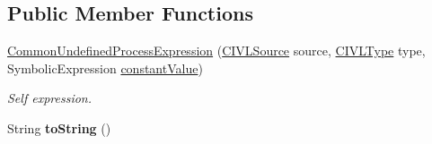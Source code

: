 \subsection*{Public Member Functions}
\begin{DoxyCompactItemize}
\item 
\hyperlink{classedu_1_1udel_1_1cis_1_1vsl_1_1civl_1_1model_1_1common_1_1expression_1_1CommonUndefinedProcessExpression_a40c6feffcf30d3a8f9f5eccdd7dcc546}{Common\+Undefined\+Process\+Expression} (\hyperlink{interfaceedu_1_1udel_1_1cis_1_1vsl_1_1civl_1_1model_1_1IF_1_1CIVLSource}{C\+I\+V\+L\+Source} source, \hyperlink{interfaceedu_1_1udel_1_1cis_1_1vsl_1_1civl_1_1model_1_1IF_1_1type_1_1CIVLType}{C\+I\+V\+L\+Type} type, Symbolic\+Expression \hyperlink{classedu_1_1udel_1_1cis_1_1vsl_1_1civl_1_1model_1_1common_1_1expression_1_1CommonExpression_a7e87d87775778380f166d4704c0dc269}{constant\+Value})
\begin{DoxyCompactList}\small\item\em Self expression. \end{DoxyCompactList}\item 
\hypertarget{classedu_1_1udel_1_1cis_1_1vsl_1_1civl_1_1model_1_1common_1_1expression_1_1CommonUndefinedProcessExpression_ab121b864bdba349fc54c2d48082b95ef}{}String {\bfseries to\+String} ()\label{classedu_1_1udel_1_1cis_1_1vsl_1_1civl_1_1model_1_1common_1_1expression_1_1CommonUndefinedProcessExpression_ab121b864bdba349fc54c2d48082b95ef}


\end{DoxyCompactItemize}
